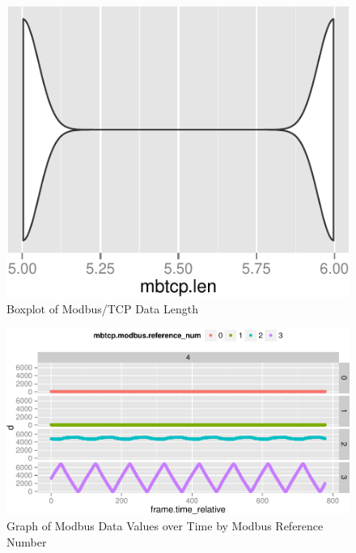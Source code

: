 \documentclass[11pt,]{article}
\begin{document}
\begin{figure}

{\centering \includegraphics{thesis_files/figure-latex/unnamed-chunk-27-1} 

}

\caption{Boxplot of Modbus/TCP Data Length}\label{fig:unnamed-chunk-27}
\end{figure}

\clearpage

\begin{figure}

{\centering \includegraphics{thesis_files/figure-latex/unnamed-chunk-28-1} 

}

\caption{Graph of Modbus Data Values over Time by Modbus  Reference Number}\label{fig:unnamed-chunk-28}
\end{figure}
\end{document}
